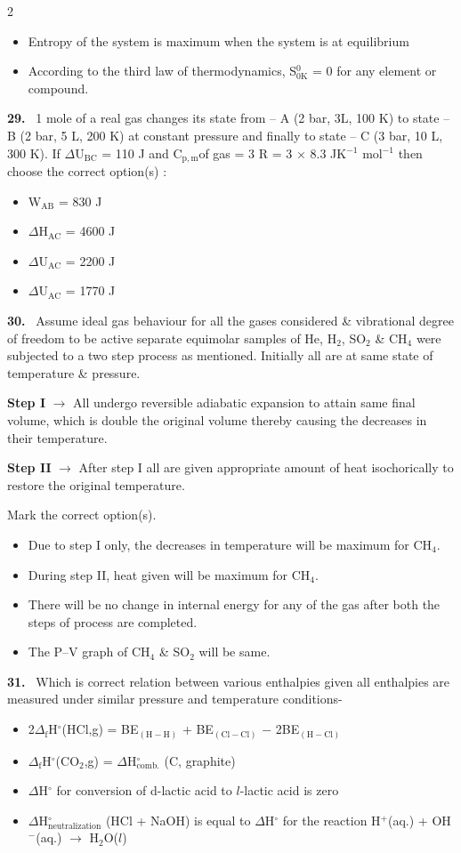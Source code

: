 \documentclass[10pt]{extarticle}
\newcommand{\qn}[1]{\par\smallskip\noindent\textbf{#1.}~}
\newenvironment{qoptions}{\begin{itemize}[leftmargin=1.8em,itemsep=1pt,topsep=2pt,label={}]}{\end{itemize}}
\newcommand{\opt}[2]{\item[(#1)] #2}
\begin{document}
\begin{multicols}{2}
\begin{qoptions}
\opt{C}{Entropy of the system is maximum when the system is at equilibrium}
\opt{D}{According to the third law of thermodynamics, S$^0_\mathrm{0K}$ = 0 for any element or compound.}
\end{qoptions}
\qn{29} 1 mole of a real gas changes its state from -- A (2 bar, 3L, 100 K) to state -- B (2 bar, 5 L, 200 K) at constant pressure and finally to state -- C (3 bar, 10 L, 300 K). If $\Delta$U$_\mathrm{BC}$ = 110 J and C$_\mathrm{p,m}$of gas = 3 R = 3 $\times$ 8.3 JK$^{-1}$ mol$^{-1}$ then choose the correct option(s) :
\begin{qoptions}
\opt{A}{W$_\mathrm{AB}$ = 830 J}
\opt{B}{$\Delta$H$_\mathrm{AC}$ = 4600 J}
\opt{C}{$\Delta$U$_\mathrm{AC}$ = 2200 J}
\opt{D}{$\Delta$U$_\mathrm{AC}$ = 1770 J}
\end{qoptions}
\qn{30} Assume ideal gas behaviour for all the gases considered \& vibrational degree of freedom to be active separate equimolar samples of He, H$_2$, SO$_2$ \& CH$_4$ were subjected to a two step process as mentioned. Initially all are at same state of temperature \& pressure.\par
\textbf{Step I} $\to$ All undergo reversible adiabatic expansion to attain same final volume, which is double the original volume thereby causing the decreases in their temperature.\par
\textbf{Step II} $\to$ After step I all are given appropriate amount of heat isochorically to restore the original temperature.\par
Mark the correct option(s).
\begin{qoptions}
\opt{A}{Due to step I only, the decreases in temperature will be maximum for CH$_4$.}
\opt{B}{During step II, heat given will be maximum for CH$_4$.}
\opt{C}{There will be no change in internal energy for any of the gas after both the steps of process are completed.}
\opt{D}{The P--V graph of CH$_4$ \& SO$_2$ will be same.}
\end{qoptions}
\qn{31} Which is correct relation between various enthalpies given all enthalpies are measured under similar pressure and temperature conditions-
\begin{qoptions}
\opt{A}{2$\Delta_\mathrm f$H$^\circ$(HCl,g) = BE$_\mathrm{(H-H)}$ + BE$_\mathrm{(Cl-Cl)}$ $-$ 2BE$_\mathrm{(H-Cl)}$}
\opt{B}{$\Delta_\mathrm f$H$^\circ$(CO$_2$,g) = $\Delta$H$^\circ_\mathrm{comb.}$ (C, graphite)}
\opt{C}{$\Delta$H$^\circ$ for conversion of d-lactic acid to $l$-lactic acid is zero}
\opt{D}{$\Delta$H$^\circ_\mathrm{neutralization}$ (HCl + NaOH) is equal to $\Delta$H$^\circ$ for the reaction H$^+$(aq.) + OH$^-$(aq.) $\to$ H$_2$O($l$)}

\end{qoptions}
\end{multicols}
\end{document}
